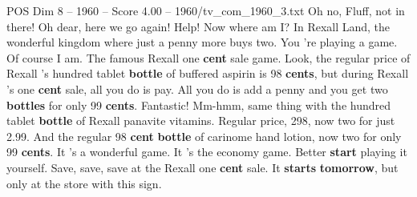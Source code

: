 \begin{textsample}{POS Dim 8 – 1960 – Score 4.00 – 1960/tv\_com\_1960\_3.txt}  \label{ex:f8_pos_061}
Oh no, Fluff, not in there!
Oh dear, here we go again!
Help!
Now where am I?
In Rexall Land, the wonderful kingdom where just a penny more buys two.
You 're playing a game.
Of course I am.
The famous Rexall one \textbf{cent} sale game.
Look, the regular price of Rexall 's hundred tablet \textbf{bottle} of buffered aspirin is 98 \textbf{cents}, but during Rexall 's one \textbf{cent} sale, all you do is pay.
All you do is add a penny and you get two \textbf{bottles} for only 99 \textbf{cents}.
Fantastic!
Mm-hmm, same thing with the hundred tablet \textbf{bottle} of Rexall panavite vitamins.
Regular price, 298, now two for just 2.99.
And the regular 98 \textbf{cent} \textbf{bottle} of carinome hand lotion, now two for only 99 \textbf{cents}.
It 's a wonderful game.
It 's the economy game.
Better \textbf{start} playing it yourself.
Save, save, save at the Rexall one \textbf{cent} sale.
It \textbf{starts} \textbf{tomorrow}, but only at the store with this sign.

\end{textsample}
